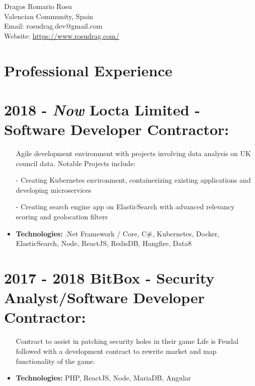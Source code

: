 \documentclass[12pt,a4paper]{res}
\begin{document}
\thispagestyle{empty}
  \begin{center}
  \Large{Dragos Romario Rosu  \\ [12pt]}
  \normalsize Valencian Community, Spain\\
  Email: rosudrag.dev@gmail.com\\
  Website: \url{https://www.rosudrag.com/}
  \end{center}
  
\begin{resume}
\vspace{-10mm}
\section{\large\bf Professional Experience}

\section{\bf 2018 - \textit{Now} \hspace{0.6mm} Locta Limited - Software Developer Contractor:}
\vspace{5mm}    
	\begin{itemize}
	\item[] Agile development environment with projects involving data analysis on UK council data. Notable Projects include: 
  \item[-] Creating Kubernetes environment, containerizing existing applications and developing microservices
  \item[-] Creating search engine app on ElasticSearch with advanced relevancy scoring and geolocation filters
	\item \textbf{Technologies:} .Net Framework / Core, C\#, Kubernetes, Docker, ElasticSearch, Node, ReactJS, RedisDB, Hangfire, Data8
	\end{itemize}
\section{\bf 2017 - 2018 \hspace{0.3mm} BitBox - Security Analyst/Software Developer Contractor:}
\vspace{5mm}    
	\begin{itemize}
	\item[]Contract to assist in patching security holes in their game Life is Feudal followed with a development contract to rewrite market and map functionality of the game.
	\item \textbf{Technologies:} PHP, ReactJS, Node, MariaDB, Angular
	\end{itemize}

\end{resume}
\end{document}

